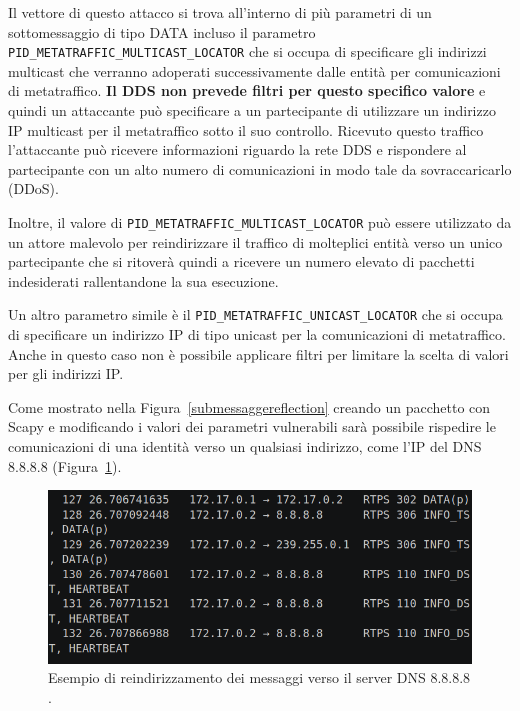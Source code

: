 Il vettore di questo attacco si trova all'interno di più parametri 
di un sottomessaggio di tipo DATA 
incluso il parametro 
\texttt{PID\_METATRAFFIC\_MULTICAST\_LOCATOR} che si occupa di specificare 
gli indirizzi multicast che verranno adoperati successivamente dalle 
entità per comunicazioni di metatraffico.
\textbf{Il DDS non prevede filtri per questo 
specifico valore} e quindi un attaccante può specificare a un 
partecipante di utilizzare un indirizzo IP multicast per il metatraffico 
sotto il suo controllo. Ricevuto questo traffico l'attaccante può 
ricevere informazioni riguardo la rete DDS e rispondere al partecipante
con un alto numero di comunicazioni in modo tale da sovraccaricarlo (DDoS).

Inoltre, il valore 
di \texttt{PID\_METATRAFFIC\_MULTICAST\_LOCATOR} può essere utilizzato 
da un attore malevolo per reindirizzare il traffico di molteplici 
entità verso un unico partecipante che si ritoverà quindi a ricevere un 
numero elevato di pacchetti indesiderati rallentandone la sua esecuzione.

Un altro parametro simile è il \texttt{PID\_METATRAFFIC\_UNICAST\_LOCATOR}
che si occupa di specificare un indirizzo IP di tipo unicast 
per la comunicazioni di metatraffico. Anche in questo caso non è
possibile applicare filtri per limitare la scelta di valori per 
gli indirizzi IP. 

Come mostrato nella 
Figura~\ref{submessaggereflection} creando un pacchetto con Scapy e
modificando i valori dei parametri vulnerabili 
sarà possibile 
rispedire le comunicazioni di una identità verso un qualsiasi
indirizzo, come l'IP del DNS 8.8.8.8 (Figura~\ref{reflectionattackdns}).


\begin{figure}[H]
    \centering
    \includegraphics[width=15.2cm, keepaspectratio]{img/reflectionattackdns.png}
    \caption{Esempio di reindirizzamento dei messaggi verso il server DNS 8.8.8.8
    \cite{mayoral2022robot}.}
    \label{reflectionattackdns}
\end{figure}

